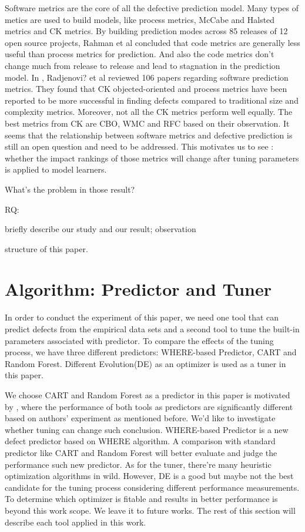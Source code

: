 \documentclass{acm_proc_article-sp}
\begin{document}
Software metrics are the core of all the defective prediction model. Many types of metics
are used to build models, like process metrics, McCabe and Halsted metrics  and CK metrics.
By building prediction modes across 85 releases of 12 open source projects, Rahman et al
\cite{rahman2013how}  concluded that code metrics are generally less useful than process
metrics for prediction. And also the code metrics don't change much from release to release
and lead to stagnation in the prediction model. In \cite{Radjenovi?20131397}, Radjenovi? et al
\cite{Radjenovi?20131397} reviewed 106 papers regarding software prediction metrics. They found
that CK objected-oriented and process metrics have been reported to be more successful in
finding defects compared to traditional size and complexity metrics. Moreover, not all the CK
metrics perform well equally. The best metrics from CK are CBO, WMC and RFC based on their 
observation. It seems that the relationship between software metrics and defective prediction is
still an open question and need to be addressed. This motivates us to see : whether the impact
rankings of those metrics will change after tuning parameters
is applied to model learners.



What's the problem in those result?

RQ:

briefly describe our study and  our result; observation

structure of this paper.


\section{Algorithm: Predictor and Tuner}

In order to conduct the experiment of this paper, we need one tool that can predict defects 
from the empirical data sets and a second tool to tune the built-in parameters associated with 
predictor. To compare the effects of the tuning process, we have three different predictors: 
WHERE-based Predictor, CART and Random Forest. Different Evolution(DE) as an optimizer 
is used as a tuner in this paper.

We choose CART and Random Forest as a predictor in this paper is motivated by 
\cite{lessmann2008benchmarking}, where the performance of both tools as predictors are 
significantly different based on authors' experiment as mentioned before. We'd like to 
investigate whether tuning can change such conclusion. WHERE-based Predictor is a new 
defect predictor based on WHERE\cite{menzies2013local} algorithm. A comparison with 
standard predictor like CART and Random Forest will better evaluate and judge the 
performance such new predictor. As for the tuner, there're many heuristic optimization 
algorithms in wild. However, DE is a good but maybe not the best candidate for the tuning 
process considering different performance measurements. To determine which optimizer is 
fitable and results in better performance is beyond this work scope. We leave it to future 
works. The rest of this section will describe each tool applied in this work.
\end{document}
